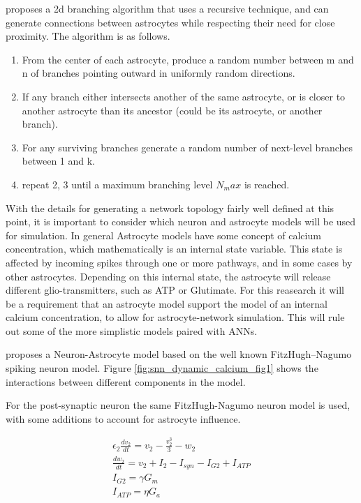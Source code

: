     \cite{snn_dynamic_calcium} proposes a 2d branching algorithm that uses a recursive technique, and can generate connections between astrocytes while respecting their need for close proximity. The algorithm is as follows.
    \begin{enumerate}
        \item From the center of each astrocyte, produce a random number between m and n of branches pointing outward in uniformly random directions.
        \item If any branch either intersects another of the same astrocyte, or is closer to another astrocyte than its ancestor (could be its astrocyte, or another branch).\
        \item For any surviving branches generate a random number of next-level branches between 1 and k.
        \item repeat 2, 3 until a maximum branching level $N_max$ is reached.
    \end{enumerate}
    
    With the details for generating a network topology fairly well defined at this point, it is important to consider which neuron and astrocyte models will be used for simulation. In general Astrocyte models have some concept of calcium concentration, which mathematically is an internal state variable. This state is affected by incoming spikes through one or more pathways, and in some cases by other astrocytes. Depending on this internal state, the astrocyte will release different glio-transmitters, such as ATP or Glutimate. For this reasearch it will be a requirement that an astrocyte model support the model of an internal calcium concentration, to allow for astrocyte-network simulation. This will rule out some of the more simplistic models paired with ANNs.
    
    \cite{snn_dynamic_calcium} proposes a Neuron-Astrocyte model based on the well known FitzHugh–Nagumo spiking neuron model. Figure \ref{fig:snn_dynamic_calcium_fig1} shows the interactions between different components in the model.
    
    
    For the post-synaptic neuron the same FitzHugh-Nagumo neuron model is used, with some additions to account for astrocyte influence.
    
    \begin{align}
        \epsilon_2 \frac{dv_2}{dt} = v_2 - \frac{v^3_2}{3} - w_2 \\
        \frac{dw_2}{dt} = v_2+I_2-I_{syn}-I_{G2}+I_{ATP} \\
        I_{G2} = \gamma G_m \\
        I_{ATP} = \eta G_a
    \end{align}
    
